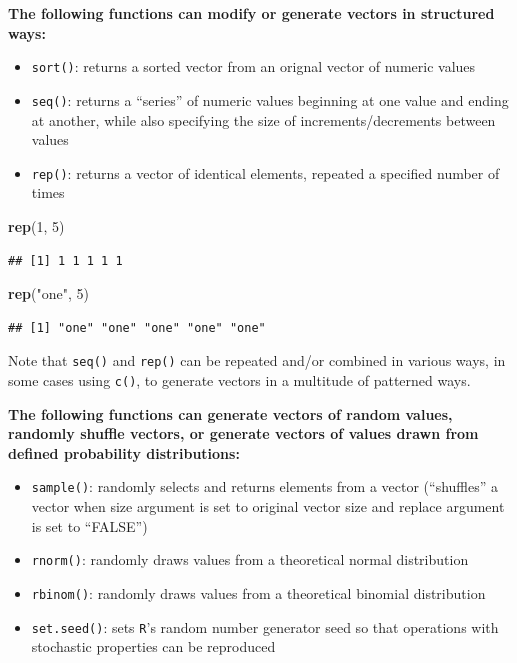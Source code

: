 \documentclass[]{book}
\newenvironment{Shaded}{\begin{snugshade}}{\end{snugshade}}
\newcommand{\DecValTok}[1]{\textcolor[rgb]{0.00,0.00,0.81}{#1}}
\newcommand{\KeywordTok}[1]{\textcolor[rgb]{0.13,0.29,0.53}{\textbf{#1}}}
\newcommand{\NormalTok}[1]{#1}
\newcommand{\StringTok}[1]{\textcolor[rgb]{0.31,0.60,0.02}{#1}}
\begin{document}
\textbf{The following functions can modify or generate vectors in structured ways:}

\begin{itemize}
\item
  \texttt{sort()}: returns a sorted vector from an orignal vector of numeric values
\item
  \texttt{seq()}: returns a ``series'' of numeric values beginning at one value and ending at another, while also specifying the size of increments/decrements between values
\item
  \texttt{rep()}: returns a vector of identical elements, repeated a specified number of times
\end{itemize}

\begin{Shaded}
\begin{Highlighting}[]
\KeywordTok{rep}\NormalTok{(}\DecValTok{1}\NormalTok{, }\DecValTok{5}\NormalTok{)}
\end{Highlighting}
\end{Shaded}

\begin{verbatim}
## [1] 1 1 1 1 1
\end{verbatim}

\begin{Shaded}
\begin{Highlighting}[]
\KeywordTok{rep}\NormalTok{(}\StringTok{"one"}\NormalTok{, }\DecValTok{5}\NormalTok{)}
\end{Highlighting}
\end{Shaded}

\begin{verbatim}
## [1] "one" "one" "one" "one" "one"
\end{verbatim}

Note that \texttt{seq()} and \texttt{rep()} can be repeated and/or combined in various ways, in some cases using \texttt{c()}, to generate vectors in a multitude of patterned ways.

\textbf{The following functions can generate vectors of random values, randomly shuffle vectors, or generate vectors of values drawn from defined probability distributions:}

\begin{itemize}
\item
  \texttt{sample()}: randomly selects and returns elements from a vector (``shuffles'' a vector when size argument is set to original vector size and replace argument is set to ``FALSE'')
\item
  \texttt{rnorm()}: randomly draws values from a theoretical normal distribution
\item
  \texttt{rbinom()}: randomly draws values from a theoretical binomial distribution
\item
  \texttt{set.seed()}: sets \texttt{R}'s random number generator seed so that operations with stochastic properties can be reproduced
\end{itemize}
\end{document}
